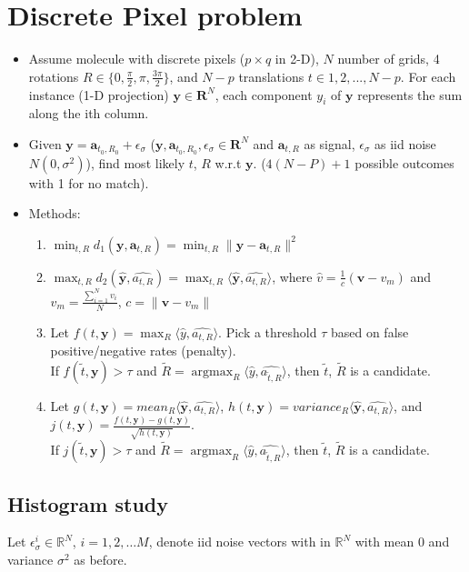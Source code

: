 \documentclass[11pt]{article}
\newcommand{\by}{\boldsymbol{y}}
\DeclareMathOperator*{\argmax}{argmax}
\begin{document}
\section{Discrete Pixel problem}
\begin{itemize}
    \item Assume molecule with discrete pixels ($p \times q$ in 2-D), $N$ number of grids, 4 rotations $R \in \{0, \frac{\pi}{2}, \pi, \frac{3\pi}{2}\}$, and $N-p$ translations $t \in {1,2,...,N-p}$. For each instance (1-D projection) $\mathbf{y} \in \mathbf{R}^N$, each component $y_i$ of $\mathbf{y}$ represents the sum along the ith column. 
    \item Given $\mathbf{y} =  \mathbf{a}_{t_0,R_0} + \epsilon_\sigma$ ($\mathbf{y}, \mathbf{a}_{t_0,R_0}, \epsilon_\sigma \in \mathbf{R}^N$ and $ \mathbf{a}_{t,R}$ as signal, $\epsilon_\sigma$ as iid noise $N(0, \sigma^2)$), find most likely $t$, $R$ w.r.t $\mathbf{y}$. ($4(N-P)+1$ possible outcomes with 1 for no match).
    \item Methods:
    \begin{enumerate}
        \item $\min_{t,R} d_{1}(\by,\mathbf{a}_{t,R}) = \min_{t, R} \lVert \by- \mathbf{a}_{t,R}\rVert^2$
        \item $\max_{t,R} d_{2}(\hat{\by}, \hat{a_{t,R}}) = \max_{t,R} \langle \hat{\by}, \hat{a_{t,R}} \rangle$, where $\hat{v} = \frac{1}{c}(\mathbf{v} - v_m)$ and $v_m = \frac{\sum_{i=1}^N v_i}{N}$, $c = \lVert \mathbf{v}- v_m\rVert$
        \item Let $f(t,\by) = \max_R \langle \hat{y}, \hat{a_{t,R}} \rangle$. Pick a threshold $\tau$ based on false positive/negative rates (penalty).\\
        If $f(\widetilde{t},\by) > \tau$ and $\widetilde{R} = \argmax_R \langle \hat{y}, \hat{a_{\widetilde{t},R}} \rangle$, then $\widetilde{t}$, $\widetilde{R}$ is a candidate.
        \item Let $g(t,\by) = {mean}_R \langle \hat{\by}, \hat{a_{t,R}} \rangle$, $h(t,\by) = {variance}_R  \langle \hat{\by}, \hat{a_{t,R}} \rangle$, and $j(t,\by) = \frac{f(t,\by)-g(t,\by)}{\sqrt{h(t,\by)}}$. \\
        If $j(\widetilde{t},\by) > \tau$ and $\widetilde{R} = \argmax_R \langle \hat{y}, \hat{a_{\widetilde{t},R}} \rangle$, then $\widetilde{t}$, $\widetilde{R}$ is a candidate.
    \end{enumerate}
\end{itemize}

\subsection{Histogram study}
Let $\epsilon_{\sigma}^{i}  \in \mathbb{R}^{N}$, $i=1,2,\ldots M$, denote iid noise vectors with in $\mathbb{R}^{N}$ with mean $0$ and variance $\sigma^2$ as before. 
\end{document}
